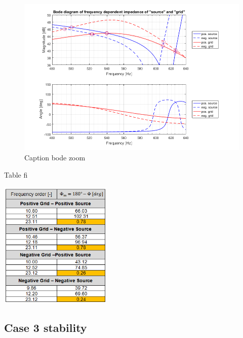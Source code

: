 \documentclass[12pt]{report} %
\begin{document}
\begin{figure}[htb]
	\centering
	\includegraphics[width=1\textwidth]{img/Case2/Case2_Bode_zoom.png}
	\caption{Caption bode zoom}
  	\label{fig:bode_zoom_case2}
\end{figure}
\FloatBarrier

\begin{table}[htb]
	\centering
	\caption{Table fi}
	\includegraphics[width=0.4\textwidth]{img/Case2/stability_fi.png}
  	\label{tab:stability_fi_case2}
\end{table}
\FloatBarrier

\subsection{Case 3 stability}
\end{document}
